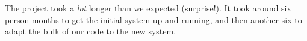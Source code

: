 \documentclass{speauth}
\begin{document}
The project took a \emph{lot} longer than we expected (surprise!).  It
took around six person-months to get the initial system up and
running, and then another six to adapt the bulk of our code to the new
system.











\end{document}
